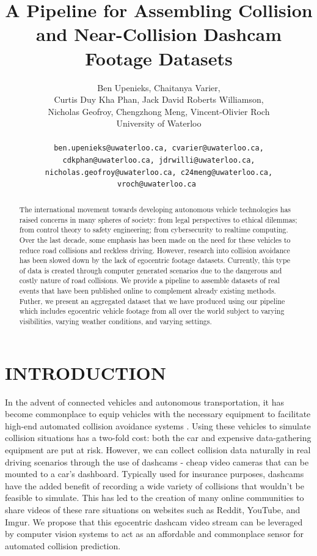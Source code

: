 \documentclass[letterpaper, 10 pt, conference]{IEEEconf}
\title{\LARGE \bf
A Pipeline for Assembling Collision and Near-Collision Dashcam Footage Datasets
}
\author{
         Ben Upenieks, Chaitanya Varier,\\
         Curtis Duy Kha Phan, Jack David Roberts Williamson,\\
         Nicholas Geofroy, Chengzhong Meng, Vincent-Olivier Roch\\
         University of Waterloo\\
         \\
         \tt\small ben.upenieks@uwaterloo.ca, cvarier@uwaterloo.ca,
         \\ \tt\small cdkphan@uwaterloo.ca, jdrwilli@uwaterloo.ca,
         \\ \tt\small nicholas.geofroy@uwaterloo.ca, c24meng@uwaterloo.ca, vroch@uwaterloo.ca
}
\begin{document}
\maketitle
\thispagestyle{empty}
\pagestyle{empty}


\begin{abstract}

The international movement towards developing autonomous vehicle technologies has raised concerns in many spheres of society: from legal perspectives \cite{Pattinson2020} to ethical dilemmas; from control theory to safety engineering; from cybersecurity to realtime computing. Over the
last decade, some emphasis has been made on the need for these vehicles to reduce road collisions and reckless driving. However, research into collision avoidance has been slowed down by the lack of egocentric footage datasets. Currently, this type of data is created through computer generated scenarios \cite{Kim_Lee_Hwang_Suh_2019} due to the dangerous and costly nature of road collisions. We provide a pipeline to assemble datasets of real events that have been published online to complement already existing methods. Futher, we present an aggregated dataset that we have produced using our pipeline which includes egocentric vehicle footage from all over the world subject to varying visibilities, varying weather conditions, and varying settings.

\end{abstract}

\section{INTRODUCTION}

In the advent of connected vehicles and autonomous transportation, it has become commonplace to equip vehicles with the necessary equipment to facilitate high-end automated collision avoidance systems \cite{Perumal2020LidarBI}.
Using these vehicles to simulate collision situations has a two-fold cost: both the car and expensive data-gathering equipment are put at risk.
However, we can collect collision data naturally in real driving scenarios through the use of dashcams - cheap video cameras that can be mounted to a car's dashboard.
Typically used for insurance purposes, dashcams have the added benefit of recording a wide variety of collisions that wouldn't be feasible to simulate. 
This has led to the creation of many online communities to share videos of these rare situations on websites such as Reddit, YouTube, and Imgur.
We propose that this egocentric dashcam video stream can be leveraged by computer vision systems to act as an affordable and commonplace sensor for automated collision prediction. 
\end{document}
